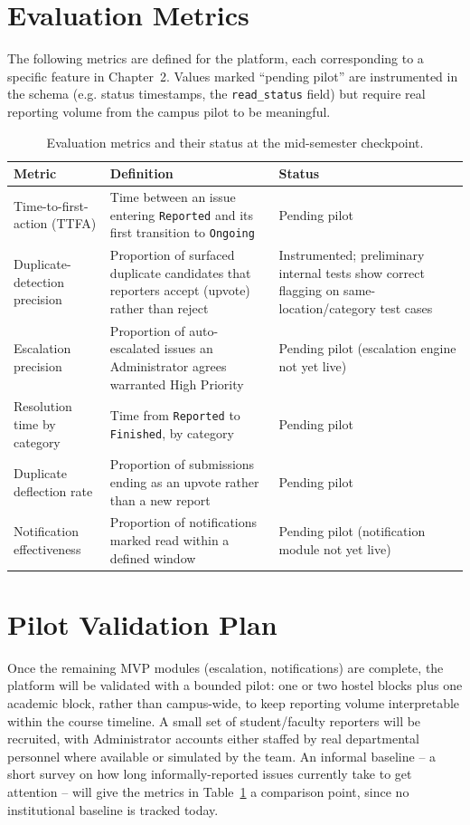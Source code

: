 \documentclass[11pt]{report}
\begin{document}
\section{Evaluation Metrics}

The following metrics are defined for the platform, each corresponding
to a specific feature in Chapter~2. Values marked ``pending pilot'' are
instrumented in the schema (e.g. status timestamps, the
\texttt{read\_status} field) but require real reporting volume from the
campus pilot to be meaningful.

\begin{table}[h]
\centering
\begin{tabular}{|p{4.6cm}|p{5.4cm}|p{3.6cm}|}
  \hline
  \textbf{Metric} & \textbf{Definition} & \textbf{Status} \\
  \hline
  Time-to-first-action (TTFA) & Time between an issue entering \texttt{Reported} and its first transition to \texttt{Ongoing} & Pending pilot \\
  \hline
  Duplicate-detection precision & Proportion of surfaced duplicate candidates that reporters accept (upvote) rather than reject & Instrumented; preliminary internal tests show correct flagging on same-location/category test cases \\
  \hline
  Escalation precision & Proportion of auto-escalated issues an Administrator agrees warranted High Priority & Pending pilot (escalation engine not yet live) \\
  \hline
  Resolution time by category & Time from \texttt{Reported} to \texttt{Finished}, by category & Pending pilot \\
  \hline
  Duplicate deflection rate & Proportion of submissions ending as an upvote rather than a new report & Pending pilot \\
  \hline
  Notification effectiveness & Proportion of notifications marked read within a defined window & Pending pilot (notification module not yet live) \\
  \hline
\end{tabular}
\caption{Evaluation metrics and their status at the mid-semester checkpoint.}
\label{tab:performance}
\end{table}

\section{Pilot Validation Plan}
\label{sec:pilot}

Once the remaining MVP modules (escalation, notifications) are
complete, the platform will be validated with a bounded pilot: one or
two hostel blocks plus one academic block, rather than campus-wide, to
keep reporting volume interpretable within the course timeline. A small
set of student/faculty reporters will be recruited, with Administrator
accounts either staffed by real departmental personnel where available
or simulated by the team. An informal baseline -- a short survey on how
long informally-reported issues currently take to get attention -- will
give the metrics in Table~\ref{tab:performance} a comparison point,
since no institutional baseline is tracked today.
\end{document}
